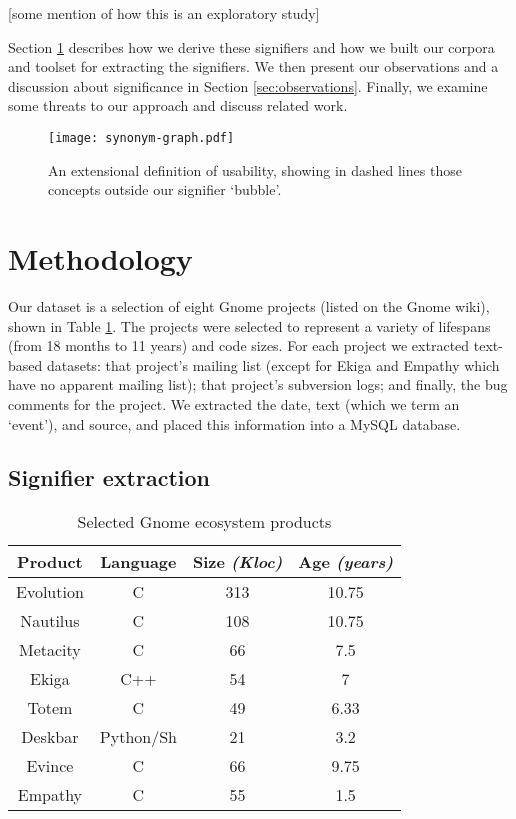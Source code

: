 \documentclass[conference, compsoc]{IEEEtran}
\begin{document}
[some mention of how this is an exploratory study]	
	
Section \ref{sec:Method} describes how we derive these signifiers and how we built our corpora and toolset for extracting the signifiers. We then present our observations and a discussion about significance in Section \ref{sec:observations}. Finally, we examine some threats to our approach and discuss related work. 

\begin{figure}[b]
\centering
\texttt{[image: synonym-graph.pdf]}
\caption{An extensional definition of usability, showing in dashed lines those concepts outside our signifier `bubble'.}
\label{fig:syngraph}
\end{figure}
	
\section{Methodology}
\label{sec:Method}
Our dataset is a selection of eight Gnome projects (listed on the Gnome wiki), shown in Table \ref{tbl:projects}. The projects were selected to represent a variety of lifespans (from 18 months to 11 years) and code sizes. For each project we extracted text-based datasets: that project's mailing list (except for Ekiga and Empathy which have no apparent mailing list); that project's subversion logs; and finally, the bug comments for the project. We extracted the date, text (which we term an `event'), and source, and placed this information into a MySQL database.

\subsection{Signifier extraction}
\begin{table}
	\caption{Selected Gnome ecosystem products}
	\centering
	\label{tbl:projects}
\begin{tabular}{|c|c|c|c|}
\hline
\rowcolor[gray]{.9} 
\textbf{Product} & \textbf{Language} & \textbf{Size} \emph{(Kloc)} & \textbf{Age} \emph{(years)} \\
\hline
\hline 
Evolution & C & 313 & 10.75\\ \hline
Nautilus & C & 108 & 10.75  \\ \hline
Metacity & C & 66 & 7.5  \\ \hline
Ekiga & C++ & 54 & 7  \\ \hline
Totem & C & 49 & 6.33  \\ \hline
Deskbar & Python/Sh & 21 & 3.2  \\ \hline
Evince & C & 66 & 9.75\\ \hline
Empathy &C & 55 & 1.5\\ 
\hline
\end{tabular}
\end{table}
\end{document}
